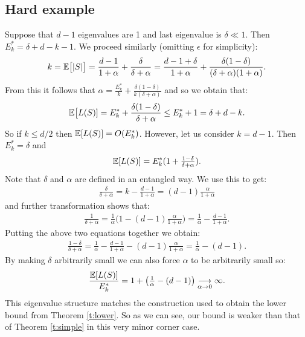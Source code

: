 \documentclass[12pt]{sty/colt2019/colt2018-arxiv}
\begin{document}
\subsection{Hard example}
Suppose that $d-1$ eigenvalues are 1 and last eigenvalue is $\delta\ll
1$. Then $E_k^*=\delta+d-k-1$. We proceed similarly (omitting
$\epsilon$ for simplicity): 
\begin{align*}
k = \mathbb E\big[|S|\big] = \frac{d-1}{1+\alpha} +
  \frac{\delta}{\delta+\alpha} = \frac{d-1+\delta}{1+\alpha} +
  \frac{\delta(1-\delta)}{(\delta+\alpha)(1+\alpha)}.
\end{align*}
From this it follows that $\alpha=\frac{E_k^*}{k} +
\frac{\delta(1-\delta)}{k(\delta+\alpha)}$ and so we obtain that:
\begin{align*}
  \mathbb E\big[L(S)] = E_k^* +  \frac{\delta(1-\delta)}{\delta+\alpha}
  \leq E_k^* + 1 = \delta +d - k.
\end{align*}
So if $k\leq d/2$ then $\mathbb E[L(S)] = O(E_k^*)$. However, let us
consider $k=d-1$. Then $E_k^*=\delta$ and 
\begin{align*}
  \mathbb E[L(S)] = E_k^*(1 +  \tfrac{1-\delta}{\delta+\alpha}).
\end{align*}
Note that $\delta$ and $\alpha$ are defined in an entangled way. We
use this to get:
\begin{align*}
  \frac{\delta}{\delta+\alpha} = k - \frac{d-1}{1+\alpha} = (d-1)\frac{\alpha}{1+\alpha}
\end{align*}
and further transformation shows that:
\begin{align*}
\frac1{\delta+\alpha} = \frac1\alpha\Big(1 -
  (d-1)\frac\alpha{1+\alpha}\Big) = \frac1\alpha -
  \frac{d-1}{1+\alpha}.
  \end{align*}
  Putting the above two equations together we obtain:
  \begin{align*}
    \frac{1-\delta}{\delta+\alpha} = \frac1\alpha -
    \frac{d-1}{1+\alpha} - (d-1)\frac\alpha{1+\alpha} = \frac1\alpha
   - (d-1).
  \end{align*}
By making $\delta$ arbitrarily small we can also force $\alpha$ to be
arbitrarily small so:
\begin{align*}
  \frac{\mathbb E[L(S)]}{E_k^*}= 1+  \big(\tfrac1\alpha - (d-1)\big)
  \underset{\alpha\rightarrow 0}{\longrightarrow} \infty.
\end{align*}
This eigenvalue structure matches the construction used to obtain the
lower bound from Theorem \ref{t:lower}. So as we can see, our bound is
weaker than that of Theorem \ref{t:simple} in this very minor corner case.
\end{document}
